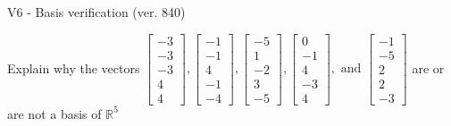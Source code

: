\begin{exercise}
  \begin{exerciseTitle}V6 - Basis verification (ver. 840)\end{exerciseTitle}
  \begin{exerciseStatement}
    Explain why the vectors \(\left[\begin{array}{r}
-3 \\
-3 \\
-3 \\
4 \\
4
\end{array}\right] , \left[\begin{array}{r}
-1 \\
-1 \\
4 \\
-1 \\
-4
\end{array}\right] , \left[\begin{array}{r}
-5 \\
1 \\
-2 \\
3 \\
-5
\end{array}\right] , \left[\begin{array}{r}
0 \\
-1 \\
4 \\
-3 \\
4
\end{array}\right] , \text{ and } \left[\begin{array}{r}
-1 \\
-5 \\
2 \\
2 \\
-3
\end{array}\right]\) are or are not a basis of \(\mathbb{R}^5\)	



\end{exerciseStatement}
\end{exercise}
